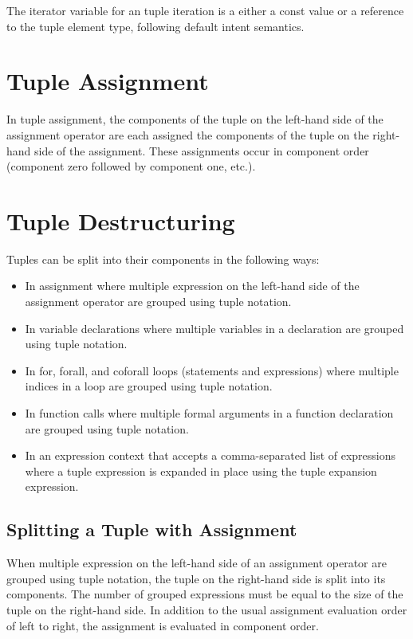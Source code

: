 The iterator variable for an tuple iteration is a either a const value
or a reference to the tuple element type, following default intent
semantics.

\section{Tuple Assignment}
\label{Tuple_Assignment}

In tuple assignment, the components of the tuple on the left-hand side
of the assignment operator are each assigned the components of the
tuple on the right-hand side of the assignment.  These assignments
occur in component order (component zero followed by component one,
etc.).

\section{Tuple Destructuring}
\label{Tuple_Destructuring}

Tuples can be split into their components in the following ways:
\begin{itemize}
\item In assignment where multiple expression on the left-hand side of
the assignment operator are grouped using tuple notation.
\item In variable declarations where multiple variables in a
declaration are grouped using tuple notation.
\item In for, forall, and coforall loops (statements and expressions)
where multiple indices in a loop are grouped using tuple notation.
\item In function calls where multiple formal arguments in a function
declaration are grouped using tuple notation.
\item In an expression context that accepts a comma-separated list of
expressions where a tuple expression is expanded in place using the
tuple expansion expression.
\end{itemize}

\subsection{Splitting a Tuple with Assignment}
\label{Assignments_in_a_Tuple}

When multiple expression on the left-hand side of an assignment
operator are grouped using tuple notation, the tuple on the right-hand
side is split into its components.  The number of grouped expressions
must be equal to the size of the tuple on the right-hand side.  In
addition to the usual assignment evaluation order of left to right,
the assignment is evaluated in component order.

